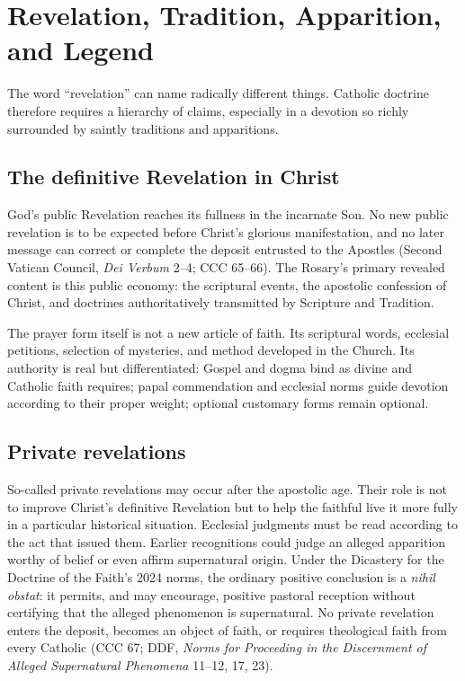 \section{Revelation, Tradition, Apparition, and Legend}

The word ``revelation'' can name radically different things. Catholic doctrine therefore requires a hierarchy of claims, especially in a devotion so richly surrounded by saintly traditions and apparitions.

\subsection{The definitive Revelation in Christ}

God's public Revelation reaches its fullness in the incarnate Son. No new public revelation is to be expected before Christ's glorious manifestation, and no later message can correct or complete the deposit entrusted to the Apostles (Second Vatican Council, \emph{Dei Verbum} 2--4; CCC 65--66). The Rosary's primary revealed content is this public economy: the scriptural events, the apostolic confession of Christ, and doctrines authoritatively transmitted by Scripture and Tradition.

The prayer form itself is not a new article of faith. Its scriptural words, ecclesial petitions, selection of mysteries, and method developed in the Church. Its authority is real but differentiated: Gospel and dogma bind as divine and Catholic faith requires; papal commendation and ecclesial norms guide devotion according to their proper weight; optional customary forms remain optional.

\subsection{Private revelations}

So-called private revelations may occur after the apostolic age. Their role is not to improve Christ's definitive Revelation but to help the faithful live it more fully in a particular historical situation. Ecclesial judgments must be read according to the act that issued them. Earlier recognitions could judge an alleged apparition worthy of belief or even affirm supernatural origin. Under the Dicastery for the Doctrine of the Faith's 2024 norms, the ordinary positive conclusion is a \emph{nihil obstat}: it permits, and may encourage, positive pastoral reception without certifying that the alleged phenomenon is supernatural. No private revelation enters the deposit, becomes an object of faith, or requires theological faith from every Catholic (CCC 67; DDF, \emph{Norms for Proceeding in the Discernment of Alleged Supernatural Phenomena} 11--12, 17, 23).

